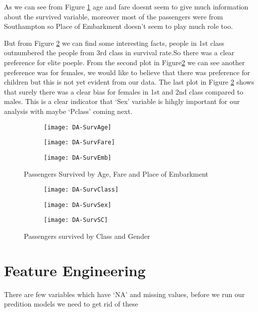 \documentclass[a4paper,10pt]{report}
\begin{document}
As we can see from Figure \ref{Surv} age and fare doesnt seem to give much information about the survived variable, moreover most of the passengers were from Southampton so Place of Embarkment doesn't seem to play much role too.

But from Figure \ref{SurvCSE} we can find some interesting facts, people in 1st class outnumbered the people from 3rd class in survival rate.So there was a clear preference for elite poeple. From the second plot in Figure\ref{SurvCSE} we can see another preference was for females, we would like to believe that there was preference for children but this is not yet evident from our data. The last plot in Figure \ref{SurvCSE} shows that surely there was a clear bias for females in 1st and 2nd class compared to males. This is a clear indicator that `Sex' variable is hihgly important for our analysis with maybe `Pclass' coming next.
\begin{figure}[h]
\centering
  \begin{subfigure}[b]{0.3\textwidth}
    \texttt{[image: DA-SurvAge]}
    \end{subfigure}
  \begin{subfigure}[b]{0.3\textwidth}
    \texttt{[image: DA-SurvFare]}
    \end{subfigure}
    \begin{subfigure}[b]{0.3\textwidth}
    \texttt{[image: DA-SurvEmb]}
  \end{subfigure}
  \caption{Passengers Survived by Age, Fare and Place of Embarkment}\label{Surv}
\end{figure}



\begin{figure}[h]
\centering
  \begin{subfigure}[b]{0.3\textwidth}
    \texttt{[image: DA-SurvClass]}
    \end{subfigure}
  \begin{subfigure}[b]{0.3\textwidth}
    \texttt{[image: DA-SurvSex]}
    \end{subfigure}
  \begin{subfigure}[b]{0.3\textwidth}
    \texttt{[image: DA-SurvSC]}
  \end{subfigure}
  \caption{Passengers survived by Class and Gender}\label{SurvCSE}
\end{figure}

\section{Feature Engineering}
There are few variables which have `NA' and missing values, before we run our predition models we need to get rid of these
\end{document}
